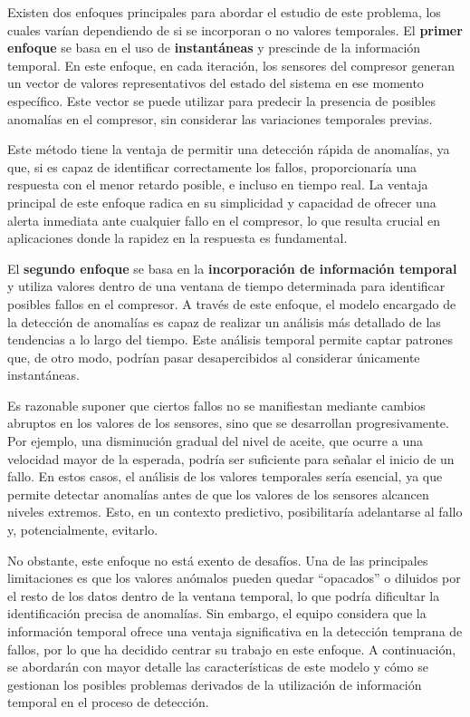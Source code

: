 \documentclass[12pt,letterpaper]{article}
\begin{document}
Existen dos enfoques principales para abordar el estudio de este problema, los cuales varían dependiendo de si se incorporan o no valores temporales. El \textbf{primer enfoque} se basa en el uso de \textbf{instantáneas} y prescinde de la información temporal. En este enfoque, en cada iteración, los sensores del compresor generan un vector de valores representativos del estado del sistema en ese momento específico. Este vector se puede utilizar para predecir la presencia de posibles anomalías en el compresor, sin considerar las variaciones temporales previas.

Este método tiene la ventaja de permitir una detección rápida de anomalías, ya que, si es capaz de identificar correctamente los fallos, proporcionaría una respuesta con el menor retardo posible, e incluso en tiempo real. La ventaja principal de este enfoque radica en su simplicidad y capacidad de ofrecer una alerta inmediata ante cualquier fallo en el compresor, lo que resulta crucial en aplicaciones donde la rapidez en la respuesta es fundamental.

El \textbf{segundo enfoque} se basa en la \textbf{incorporación de información temporal} y utiliza valores dentro de una ventana de tiempo determinada para identificar posibles fallos en el compresor. A través de este enfoque, el modelo encargado de la detección de anomalías es capaz de realizar un análisis más detallado de las tendencias a lo largo del tiempo. Este análisis temporal permite captar patrones que, de otro modo, podrían pasar desapercibidos al considerar únicamente instantáneas.

Es razonable suponer que ciertos fallos no se manifiestan mediante cambios abruptos en los valores de los sensores, sino que se desarrollan progresivamente. Por ejemplo, una disminución gradual del nivel de aceite, que ocurre a una velocidad mayor de la esperada, podría ser suficiente para señalar el inicio de un fallo. En estos casos, el análisis de los valores temporales sería esencial, ya que permite detectar anomalías antes de que los valores de los sensores alcancen niveles extremos. Esto, en un contexto predictivo, posibilitaría adelantarse al fallo y, potencialmente, evitarlo.

No obstante, este enfoque no está exento de desafíos. Una de las principales limitaciones es que los valores anómalos pueden quedar ``opacados'' o diluidos por el resto de los datos dentro de la ventana temporal, lo que podría dificultar la identificación precisa de anomalías. Sin embargo, el equipo considera que la información temporal ofrece una ventaja significativa en la detección temprana de fallos, por lo que ha decidido centrar su trabajo en este enfoque. A continuación, se abordarán con mayor detalle las características de este modelo y cómo se gestionan los posibles problemas derivados de la utilización de información temporal en el proceso de detección.
\end{document}
